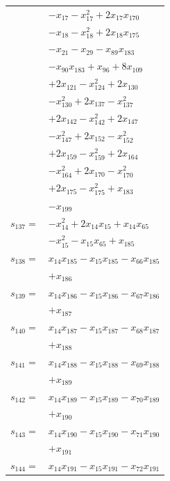 \begin{longtable}{@{}r@{\;}l@{}}
 & \(\displaystyle -x_{17} -x_{17}^{2} +2x_{17}x_{170}\) \\
 & \(\displaystyle -x_{18} -x_{18}^{2} +2x_{18}x_{175}\) \\
 & \(\displaystyle -x_{21} -x_{29} -x_{89}x_{183}\) \\
 & \(\displaystyle -x_{90}x_{183} +x_{96} +8x_{109}\) \\
 & \(\displaystyle +2x_{121} -x_{124}^{2} +2x_{130}\) \\
 & \(\displaystyle -x_{130}^{2} +2x_{137} -x_{137}^{2}\) \\
 & \(\displaystyle +2x_{142} -x_{142}^{2} +2x_{147}\) \\
 & \(\displaystyle -x_{147}^{2} +2x_{152} -x_{152}^{2}\) \\
 & \(\displaystyle +2x_{159} -x_{159}^{2} +2x_{164}\) \\
 & \(\displaystyle -x_{164}^{2} +2x_{170} -x_{170}^{2}\) \\
 & \(\displaystyle +2x_{175} -x_{175}^{2} +x_{183}\) \\
 & \(\displaystyle -x_{199}\) \\[3pt]
\(s_{137}=\) & \(\displaystyle -x_{14}^{2} +2x_{14}x_{15} +x_{14}x_{65}\) \\
 & \(\displaystyle -x_{15}^{2} -x_{15}x_{65} +x_{185}\) \\[3pt]
\(s_{138}=\) & \(\displaystyle x_{14}x_{185} -x_{15}x_{185} -x_{66}x_{185}\) \\
 & \(\displaystyle +x_{186}\) \\[3pt]
\(s_{139}=\) & \(\displaystyle x_{14}x_{186} -x_{15}x_{186} -x_{67}x_{186}\) \\
 & \(\displaystyle +x_{187}\) \\[3pt]
\(s_{140}=\) & \(\displaystyle x_{14}x_{187} -x_{15}x_{187} -x_{68}x_{187}\) \\
 & \(\displaystyle +x_{188}\) \\[3pt]
\(s_{141}=\) & \(\displaystyle x_{14}x_{188} -x_{15}x_{188} -x_{69}x_{188}\) \\
 & \(\displaystyle +x_{189}\) \\[3pt]
\(s_{142}=\) & \(\displaystyle x_{14}x_{189} -x_{15}x_{189} -x_{70}x_{189}\) \\
 & \(\displaystyle +x_{190}\) \\[3pt]
\(s_{143}=\) & \(\displaystyle x_{14}x_{190} -x_{15}x_{190} -x_{71}x_{190}\) \\
 & \(\displaystyle +x_{191}\) \\[3pt]
\(s_{144}=\) & \(\displaystyle x_{14}x_{191} -x_{15}x_{191} -x_{72}x_{191}\) \\

\end{longtable}
